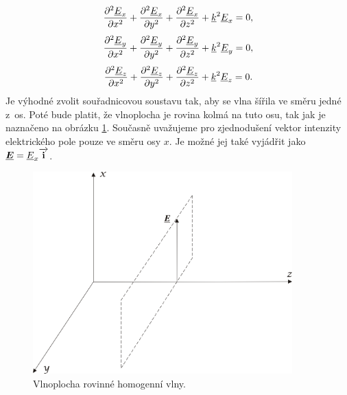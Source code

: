 \begin{equation}
	\frac{\partial ^{2} {\underline{E}}_{x}}{\partial x^{2}} + \frac{\partial ^{2}{\underline{E}}_{x}}{\partial y^{2}} + \frac{\partial ^{2}{\underline{E}}_{x}}{\partial z^{2}} + {\underline{k}}^{2} {\underline{E}}_{x} = 0,
	\label{rce:evlny_skalarni1}
\end{equation}
\begin{equation}
	\frac{\partial ^{2} {\underline{E}}_{y}}{\partial x^{2}} + \frac{\partial ^{2} {\underline{E}}_{y}}{\partial y^{2}} + \frac{\partial ^{2} {\underline{E}}_{y}}{\partial z^{2}} + {\underline{k}}^{2} {\underline{E}}_{y} = 0,
	\label{rce:evlny_skalarni2}
\end{equation}
\begin{equation}
	\frac{\partial ^{2} {\underline{E}}_{z}}{\partial x^{2}} + \frac{\partial ^{2} {\underline{E}}_{z}}{\partial y^{2}} + \frac{\partial ^{2} {\underline{E}}_{z}}{\partial z^{2}} + {\underline{k}}^{2} {\underline{E}}_{z} = 0.
	\label{rce:evlny_skalarni3}	
\end{equation}
Je výhodné zvolit souřadnicovou soustavu tak, aby se vlna šířila ve směru jedné z~os. Poté bude platit, že vlnoplocha je rovina kolmá na tuto osu, tak jak je naznačeno na obrázku \ref{obr:evlny_vlnoplocha}. Současně uvažujeme pro zjednodušení vektor intenzity elektrického pole pouze ve směru osy $x$. Je možné jej také vyjádřit jako $\mbox{\underline{\boldmath$E$}} = {\underline{E}}_{x}\overrightarrow{\mathrm{\textbf{i}}}$.

\begin{figure}[!h]
	\centering
	\includegraphics[width=10cm]{evlny_vlnoplocha.png}
	\caption{Vlnoplocha rovinné homogenní vlny. \cite{emp}}
	\label{obr:evlny_vlnoplocha}
\end{figure}

